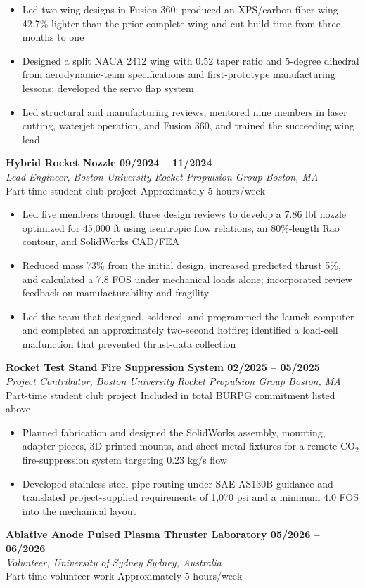 \documentclass[letterpaper,11pt]{article}
\newcommand{\resumeEntry}[4]{
  {\small\textbf{#1 \textbar{} #2}}\\[-1pt]
  {\small\textit{#3}}\\[-1pt]
  {\small #4}
}
\newcommand{\resumeItem}[1]{\item \small{#1}}
\newcommand{\resumeItemListStart}{
  \begin{itemize}[
    leftmargin=0.17in,
    label=\textbullet,
    itemsep=1.5pt,
    topsep=2pt,
    parsep=0pt,
    partopsep=0pt
  ]
}
\newcommand{\resumeItemListEnd}{
  \end{itemize}\vspace{3pt}
}
\begin{document}
\resumeItemListStart
  \resumeItem{
    Led two wing designs in Fusion 360; produced an
    XPS/carbon-fiber wing 42.7\% lighter than the prior complete
    wing and cut build time from three months to one
  }
  \resumeItem{
    Designed a split NACA 2412 wing with 0.52 taper ratio and
    5-degree dihedral from aerodynamic-team specifications and
    first-prototype manufacturing lessons; developed the servo flap
    system
  }
  \resumeItem{
    Led structural and manufacturing reviews, mentored nine members
    in laser cutting, waterjet operation, and Fusion 360, and trained
    the succeeding wing lead
  }
\resumeItemListEnd

\resumeEntry
  {Hybrid Rocket Nozzle}
  {09/2024 -- 11/2024}
  {Lead Engineer, Boston University Rocket Propulsion Group
   \textbar{} Boston, MA}
  {Part-time student club project
   \textbar{} Approximately 5 hours/week}

\resumeItemListStart
  \resumeItem{
    Led five members through three design reviews to develop a
    7.86 lbf nozzle optimized for 45,000 ft using isentropic flow
    relations, an 80\%-length Rao contour, and SolidWorks CAD/FEA
  }
  \resumeItem{
    Reduced mass 73\% from the initial design, increased predicted
    thrust 5\%, and calculated a 7.8 FOS under mechanical loads
    alone; incorporated review feedback on manufacturability and fragility
  }
  \resumeItem{
    Led the team that designed, soldered, and programmed the launch
    computer and completed an approximately two-second hotfire;
    identified a load-cell malfunction that prevented thrust-data
    collection
  }
\resumeItemListEnd

\resumeEntry
  {Rocket Test Stand Fire Suppression System}
  {02/2025 -- 05/2025}
  {Project Contributor, Boston University Rocket Propulsion Group
   \textbar{} Boston, MA}
  {Part-time student club project
   \textbar{} Included in total BURPG commitment listed above}

\resumeItemListStart
  \resumeItem{
    Planned fabrication and designed the SolidWorks assembly,
    mounting, adapter pieces, 3D-printed mounts, and sheet-metal
    fixtures for a remote CO$_2$ fire-suppression system targeting
    0.23 kg/s flow
  }
  \resumeItem{
    Developed stainless-steel pipe routing under SAE AS130B guidance
    and translated project-supplied requirements of 1,070 psi and a
    minimum 4.0 FOS into the mechanical layout
  }
\resumeItemListEnd

\resumeEntry
  {Ablative Anode Pulsed Plasma Thruster Laboratory}
  {05/2026 -- 06/2026}
  {Volunteer, University of Sydney \textbar{} Sydney, Australia}
  {Part-time volunteer work
   \textbar{} Approximately 5 hours/week}
\end{document}
